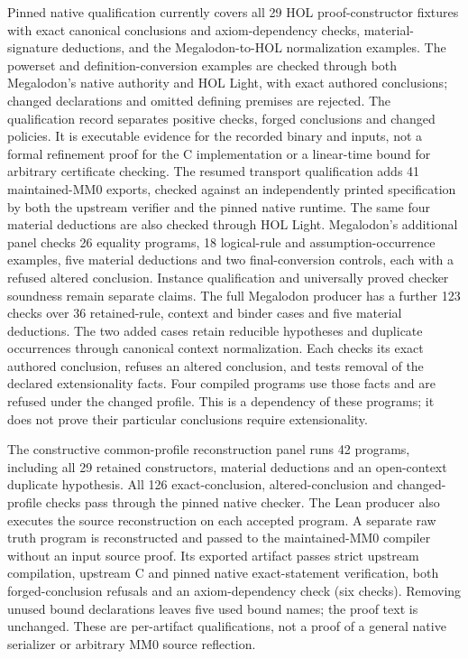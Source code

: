 \documentclass[11pt]{article}
\theoremstyle{definition}
\theoremstyle{remark}
\begin{document}
Pinned native qualification currently covers all 29 HOL proof-constructor
fixtures with exact canonical conclusions and axiom-dependency checks,
material-signature deductions, and the Megalodon-to-HOL normalization examples.
The powerset and definition-conversion examples are checked through both
Megalodon's native authority and HOL Light, with exact authored conclusions;
changed declarations and omitted defining premises are rejected.
The qualification record separates positive checks, forged conclusions and
changed policies. It is executable evidence for the recorded binary and
inputs, not a formal refinement proof for the C implementation or a
linear-time bound for arbitrary certificate checking.
The resumed transport qualification adds 41 maintained-MM0 exports, checked
against an independently printed specification by both the upstream verifier
and the pinned native runtime. The same four material deductions are also
checked through HOL Light. Megalodon's additional panel checks 26 equality
programs, 18 logical-rule and assumption-occurrence examples, five material
deductions and two final-conversion controls, each with a refused altered
conclusion. Instance qualification and universally proved checker soundness
remain separate claims.
The full Megalodon producer has a further 123 checks over 36 retained-rule,
context and binder cases and five material deductions. The two added cases
retain reducible hypotheses and duplicate occurrences through canonical
context normalization. Each checks its exact
authored conclusion, refuses an altered conclusion, and tests removal of the
declared extensionality facts. Four compiled programs use those facts and are
refused under the changed profile. This is a dependency of these programs;
it does not prove their particular conclusions require extensionality.


The constructive common-profile reconstruction panel runs 42 programs, including
all 29 retained constructors, material deductions and an open-context duplicate
hypothesis. All 126 exact-conclusion, altered-conclusion and changed-profile
checks pass through the pinned native checker. The Lean producer also executes
the source reconstruction on each accepted program. A separate raw truth program
is reconstructed and passed to the maintained-MM0 compiler without an input source
proof. Its exported artifact passes strict upstream compilation, upstream C and
pinned native exact-statement verification, both forged-conclusion refusals and
an axiom-dependency check (six checks). Removing unused bound declarations leaves
five used bound names; the proof text is unchanged. These are per-artifact
qualifications, not a proof of a general native serializer or arbitrary MM0
source reflection.
\end{document}

